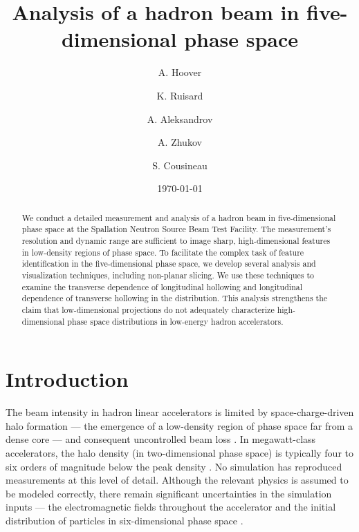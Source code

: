 \documentclass[%
 reprint,
nofootinbib,
 amsmath,amssymb,
 aps,
prstab,
]{revtex4-2}
\begin{document}

\title{Analysis of a hadron beam in five-dimensional phase space}

\author{A. Hoover}%
\author{K. Ruisard}%
\author{A. Aleksandrov}%
\author{A. Zhukov}%
\author{S. Cousineau}

\date{\today}


\begin{abstract}

We conduct a detailed measurement and analysis of a hadron beam in five-dimensional phase space at the Spallation Neutron Source Beam Test Facility. The measurement's resolution and dynamic range are sufficient to image sharp, high-dimensional features in low-density regions of phase space. To facilitate the complex task of feature identification in the five-dimensional phase space, we develop several analysis and visualization techniques, including non-planar slicing. We use these techniques to examine the transverse dependence of longitudinal hollowing and longitudinal dependence of transverse hollowing in the distribution. This analysis strengthens the claim that low-dimensional projections do not adequately characterize high-dimensional phase space distributions in low-energy hadron accelerators.

\end{abstract}

\maketitle




\section{Introduction}\label{sec:1}

The beam intensity in hadron linear accelerators is limited by space-charge-driven halo formation --- the emergence of a low-density region of phase space far from a dense core \cite{Gluckstern1994, Wangler1998, Batygin2021} --- and consequent uncontrolled beam loss \cite{Cousineau2015}. In megawatt-class accelerators, the halo density (in two-dimensional phase space) is typically four to six orders of magnitude below the peak density \cite{Aleksandrov2020}. No simulation has reproduced measurements at this level of detail. Although the relevant physics is assumed to be modeled correctly, there remain significant uncertainties in the simulation inputs --- the electromagnetic fields throughout the accelerator and the initial distribution of particles in six-dimensional phase space \cite{Allen2002, Qiang2002, Groening2008}. 
\end{document}
